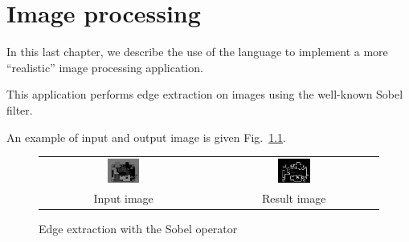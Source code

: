 
\chapter{Image processing}
\label{cha:lang-ip}

In this last chapter, we describe the use of the \caph language to implement a more ``realistic'' image
processing application.

\medskip
This application performs edge extraction on images using the
well-known Sobel filter.

An example of input and output image is given Fig.~\ref{fig:pcb-ex}.

\begin{figure}[h]
\centering
  \begin{tabular}[c]{cc}
  \includegraphics[width=0.2\textwidth]{figs/pcb.pdf} &
  \includegraphics[width=0.2\textwidth]{figs/pcb-res.pdf} \\
  Input image & Result image
  \end{tabular}
  \caption{Edge extraction with the Sobel operator}
  \label{fig:pcb-ex}
\end{figure}

